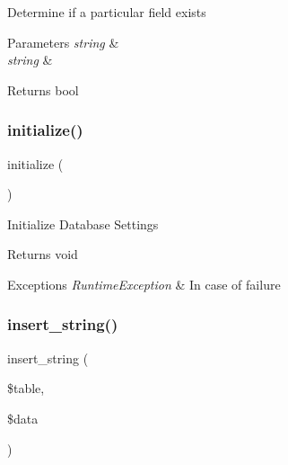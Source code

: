 Determine if a particular field exists


\begin{DoxyParams}{Parameters}
{\em string} & \\
\hline
{\em string} & \\
\hline
\end{DoxyParams}
\begin{DoxyReturn}{Returns}
bool 
\end{DoxyReturn}
\mbox{\label{class_c_i___d_b__driver_a91098fa7d1917ce4833f284bbef12627}} 
\subsubsection{\texorpdfstring{initialize()}{initialize()}}
{\footnotesize\ttfamily initialize (\begin{DoxyParamCaption}{ }\end{DoxyParamCaption})}

Initialize Database Settings

\begin{DoxyReturn}{Returns}
void 
\end{DoxyReturn}

\begin{DoxyExceptions}{Exceptions}
{\em Runtime\+Exception} & In case of failure \\
\hline
\end{DoxyExceptions}
\mbox{\label{class_c_i___d_b__driver_ad27720d886add2c9abf9ac48a9ff56d5}} 
\subsubsection{\texorpdfstring{insert\+\_\+string()}{insert\_string()}}
{\footnotesize\ttfamily insert\+\_\+string (\begin{DoxyParamCaption}\item[{}]{\$table,  }\item[{}]{\$data }\end{DoxyParamCaption})}

